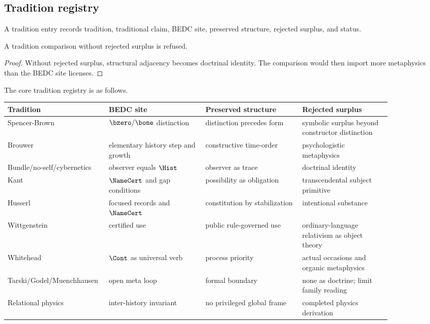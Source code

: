 \subsection{Tradition registry}
\label{subsec:philosophy-tradition-registry-table}

\begin{definition}
\label{def:philosophy-tradition-registry-entry}
A tradition entry records tradition, traditional claim, BEDC site,
preserved structure, rejected surplus, and status.
\end{definition}

\begin{theorem}
\label{thm:philosophy-tradition-registry-rejected-surplus}
A tradition comparison without rejected surplus is refused.
\end{theorem}
\begin{proof}
Without rejected surplus, structural adjacency becomes doctrinal
identity. The comparison would then import more metaphysics than the
BEDC site licenses.
\end{proof}

\begin{definition}
\label{def:philosophy-core-tradition-registry}
The core tradition registry is as follows.

\begin{center}
\begin{tabular}{p{0.18\linewidth}p{0.24\linewidth}p{0.24\linewidth}p{0.22\linewidth}}
\textbf{Tradition} & \textbf{BEDC site} & \textbf{Preserved structure} & \textbf{Rejected surplus} \\
\hline
Spencer-Brown & \(\bzero/\bone\) distinction & distinction precedes form & symbolic surplus beyond constructor distinction \\
Brouwer & elementary history step and growth & constructive time-order & psychologistic metaphysics \\
Bundle/no-self/cybernetics & observer equals \(\Hist\) & observer as trace & doctrinal identity \\
Kant & \(\NameCert\) and gap conditions & possibility as obligation & transcendental subject primitive \\
Husserl & focused records and \(\NameCert\) & constitution by stabilization & intentional substance \\
Wittgenstein & certified use & public rule-governed use & ordinary-language relativism as object theory \\
Whitehead & \(\Cont\) as universal verb & process priority & actual occasions and organic metaphysics \\
Tarski/Godel/Muenchhausen & open meta loop & formal boundary & none as doctrine; limit family reading \\
Relational physics & inter-history invariant & no privileged global frame & completed physics derivation \\
\end{tabular}
\end{center}
\end{definition}

